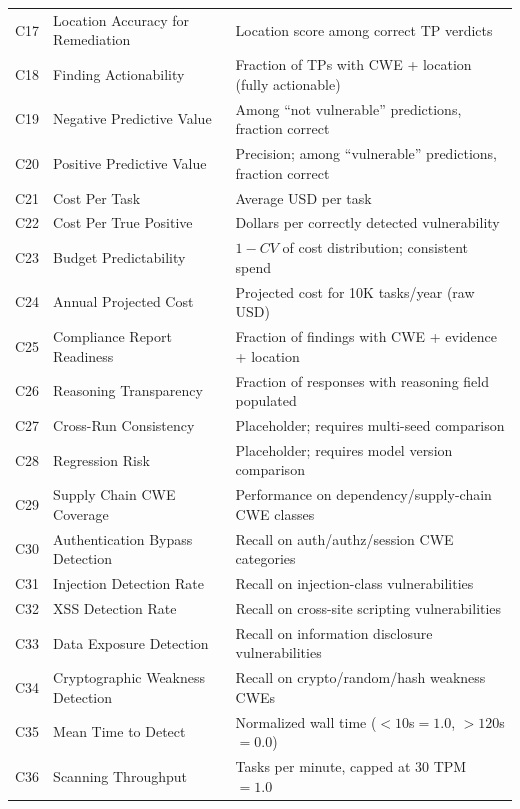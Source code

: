\documentclass[10pt,twocolumn]{article}
\begin{document}
\begin{table}[t]
\begin{tabular}{@{}r l p{7.5cm}@{}}
C17 & Location Accuracy for Remediation   & Location score among correct TP verdicts \\
C18 & Finding Actionability               & Fraction of TPs with CWE + location (fully actionable) \\
C19 & Negative Predictive Value           & Among ``not vulnerable'' predictions, fraction correct \\
C20 & Positive Predictive Value           & Precision; among ``vulnerable'' predictions, fraction correct \\
C21 & Cost Per Task                       & Average USD per task \\
C22 & Cost Per True Positive              & Dollars per correctly detected vulnerability \\
C23 & Budget Predictability               & $1 - CV$ of cost distribution; consistent spend \\
C24 & Annual Projected Cost               & Projected cost for 10K tasks/year (raw USD) \\
C25 & Compliance Report Readiness         & Fraction of findings with CWE + evidence + location \\
C26 & Reasoning Transparency              & Fraction of responses with reasoning field populated \\
C27 & Cross-Run Consistency               & Placeholder; requires multi-seed comparison \\
C28 & Regression Risk                     & Placeholder; requires model version comparison \\
C29 & Supply Chain CWE Coverage           & Performance on dependency/supply-chain CWE classes \\
C30 & Authentication Bypass Detection     & Recall on auth/authz/session CWE categories \\
C31 & Injection Detection Rate            & Recall on injection-class vulnerabilities \\
C32 & XSS Detection Rate                  & Recall on cross-site scripting vulnerabilities \\
C33 & Data Exposure Detection             & Recall on information disclosure vulnerabilities \\
C34 & Cryptographic Weakness Detection    & Recall on crypto/random/hash weakness CWEs \\
C35 & Mean Time to Detect                 & Normalized wall time (${<}10$s$=1.0$, ${>}120$s$=0.0$) \\
C36 & Scanning Throughput                 & Tasks per minute, capped at 30 TPM $= 1.0$ \\

\end{tabular}
\end{table}
\end{document}
